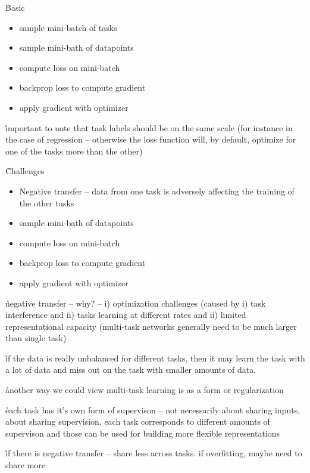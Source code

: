 \r{Basic}
\begin{itemize}[noitemsep,topsep=0pt]
	\item sample mini-batch of tasks
	\item sample mini-bath of datapoints
	\item compute loss on mini-batch
	\item backprop loss to compute gradient
	\item apply gradient with optimizer
\end{itemize}

\r{important to note that task labels should be on the same scale (for instance in the case of regression -- otherwise the loss function will, by default, optimize for one of the tasks more than the other)}

\r{Challenges}
\begin{itemize}[noitemsep,topsep=0pt]
	\item Negative transfer -- data from one task is adversely affecting the training of the other tasks
	\item sample mini-bath of datapoints
	\item compute loss on mini-batch
	\item backprop loss to compute gradient
	\item apply gradient with optimizer
\end{itemize}

\r{negative transfer -- why? -- i) optimization challenges (caused by i) task interference and ii) tasks learning at different rates and ii) limited representational capacity (multi-task networks generally need to be much larger than single task)}

\r{if the data is really unbalanced for different tasks, then it may learn the task with a lot of data and miss out on the task with smaller amounts of data.}


\r{another way we could view multi-task learning is as a form or regularization}

\r{each task has it's own form of supervison -- not necessarily about sharing inputs, about sharing supervision. each task corresponds to different amounts of supervison and those can be used for building more flexible representations}

\r{if there is negative transfer -- share less across tasks. if overfitting, maybe need to share more}

